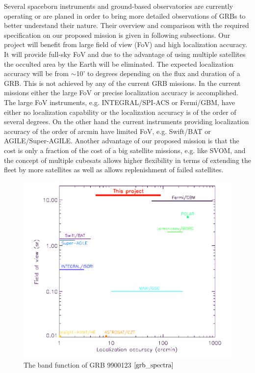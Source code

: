 \documentclass[12pt, a4paper,titlepage]{article}
\numberwithin{equation}{section}
\numberwithin{figure}{section}
\begin{document}
Several spaceborn instruments and ground-based observatories are currently operating or are planed in
order to bring more detailed observations of GRBs to better understand their nature. Their overview
and comparison with the required specification on our proposed mission is given in following
subsections.
Our project will benefit from large field of view (FoV) and high localization accuracy. It will provide
full-sky FoV and due to the advantage of using multiple satellites the occulted area by the Earth will
be eliminated. The expected localization accuracy will be from $\sim$10' to degrees depending on the flux and duration of a GRB. This is not achieved by any of the current GRB missions. In the current missions either the large FoV or precise localization accuracy is accomplished. The large FoV instruments, e.g. INTEGRAL/SPI-ACS or Fermi/GBM, have either no localization capability or the localization accuracy is of the order of several degrees. On the other hand the current instruments providing localization accuracy of the order of arcmin have limited FoV, e.g. Swift/BAT or
AGILE/Super-AGILE.
Another advantage of our proposed mission is that the cost is only a fraction of the cost of a big
satellite missions, e.g. like SVOM, and the concept of multiple cubesats allows higher flexibility in
terms of extending the fleet by more satellites as well as allows replenishment of failed satellites.

\begin{figure}[H]
\centering
\includegraphics[width=130.0mm]{images/fovvsloc.png}
\caption{The band function of GRB 9900123 $\cite{grb_spectra}$}
\end{figure}
\end{document}
